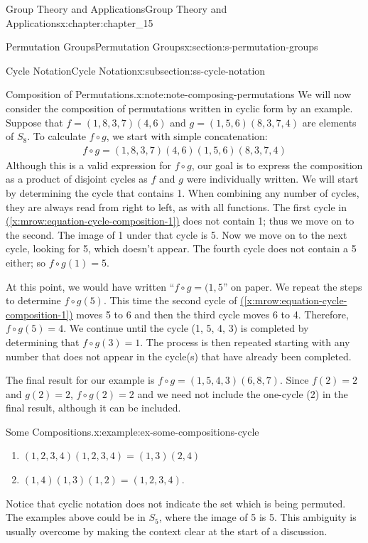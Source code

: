 \documentclass[oneside,10pt,]{book}
\newcommand{\xreffont}{\relax}
\numberwithin{equation}{section}
\begin{document}
\begin{chapterptx}{Group Theory and Applications}{}{Group Theory and Applications}{}{}{x:chapter:chapter_15}
\begin{sectionptx}{Permutation Groups}{}{Permutation Groups}{}{}{x:section:s-permutation-groups}
\begin{subsectionptx}{Cycle Notation}{}{Cycle Notation}{}{}{x:subsection:ss-cycle-notation}
\begin{note}{Composition of Permutations.}{x:note:note-composing-permutations}
%
We will now consider the composition of permutations written in cyclic form by an example. Suppose that \(f
= (1,8, 3, 7)(4, 6)\) and \(g = (1, 5, 6)(8, 3, 7, 4)\) are elements of \(S_8\). To calculate \(f\circ g\), we start with simple concatenation:%
\begin{gather}
f \circ g = (1,8, 3, 7)(4, 6)(1,5,6)(8, 3, 7,4)\label{x:mrow:equation-cycle-composition-1}
\end{gather}
Although this is a valid expression for \(f \circ g\), our goal is to express the composition as a product of disjoint cycles as \(f\) and \(g\) were individually written. We will start by determining the cycle that contains 1.  When combining any number of cycles, they are always read from right to left, as with all functions. The first cycle  in \hyperref[x:mrow:equation-cycle-composition-1]{({\xreffont\ref{x:mrow:equation-cycle-composition-1}})} does not contain 1; thus we move on to the second. The image of 1 under that cycle is 5. Now we move on to the next cycle, looking for 5, which doesn't appear. The fourth cycle does not contain a 5 either; so \(f\circ g(1) = 5\).%
\par
At this point, we would have written ``\(f \circ g = (1,5 \)'' on paper. We repeat the steps to determine \(f\circ g(5)\). This time the second cycle of \hyperref[x:mrow:equation-cycle-composition-1]{({\xreffont\ref{x:mrow:equation-cycle-composition-1}})} moves 5 to 6 and then the third cycle moves 6 to 4. Therefore, \(f\circ g(5) = 4\). We continue until the cycle (1, 5, 4, 3) is completed by determining that \(f\circ g(3) = 1\). The process is  then repeated starting with any number that does not appear in the cycle(s) that have already been completed.%
\par
The final result for our example is \(f \circ g = (1, 5, 4, 3)(6, 8, 7)\). Since \(f(2) = 2\) and \(g(2) = 2\), \(f\circ g(2) = 2\) and we need not include the one-cycle (2) in the final result, although it can be included.%
\end{note}
\begin{example}{Some Compositions.}{x:example:ex-some-compositions-cycle}%
%
\begin{enumerate}[label=(\alph*)]
\item{}\((1, 2, 3, 4)(1, 2, 3, 4) = (1, 3)(2, 4)\)%
\item{}\((1, 4)(1, 3)(1, 2) = (1, 2, 3, 4)\).%
\end{enumerate}
Notice that cyclic notation does not indicate the set which is being permuted. The examples above could be in \(S_5\), where the image of 5 is 5. This ambiguity is usually overcome by making the context clear at the start of a discussion.%

\end{example}
\end{subsectionptx}
\end{sectionptx}
\end{chapterptx}
\end{document}
